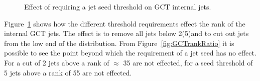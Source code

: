 \begin{figure}[h!]
    \centering
    \caption{Effect of requiring a jet seed threshold on GCT internal jets.}
    \label{fig:GCTrank}
\end{figure}


Figure~\ref{fig:GCTrank} shows how the different threshold requirements effect the rank of the internal GCT jets.
The effect is to remove all jets below 2(5)\GeV and to cut out jets from the low end of the distribution. 
From Figure~\ref{fig:GCTrankRatio} it is possible to see the point beyond which the requirement of a jet seed has no effect. 
For a cut of 2 \GeV jets above a rank of $\approx$ 35 are not effected, for a seed threshold of 5 \GeV jets above a 
rank of 55 are not effected.



